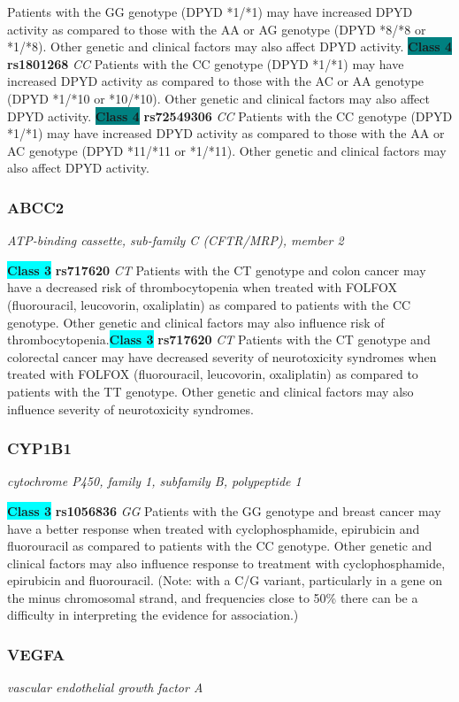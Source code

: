 \documentclass{report}
\begin{document}
Patients with the GG genotype (DPYD *1/*1) may have increased DPYD activity as compared to those with the AA or AG genotype (DPYD *8/*8 or *1/*8). Other genetic and clinical factors may also affect DPYD activity. \newline\textbf{\colorbox{teal} {Class 4}} \textbf{ rs1801268 } \textit{ CC }
Patients with the CC genotype (DPYD *1/*1) may have increased DPYD activity as compared to those with the AC or AA genotype (DPYD *1/*10 or *10/*10). Other genetic and clinical factors may also affect DPYD activity. \newline\textbf{\colorbox{teal} {Class 4}} \textbf{ rs72549306 } \textit{ CC }
Patients with the CC genotype (DPYD *1/*1) may have increased DPYD activity as compared to those with the AA or AC genotype (DPYD *11/*11 or *1/*11). Other genetic and clinical factors may also affect DPYD activity.\newline\subsubsection{ ABCC2 }
\textit{ ATP-binding cassette, sub-family C (CFTR/MRP), member 2 }

\textbf{\colorbox{cyan} {Class 3}} \textbf{ rs717620 } \textit{ CT }
Patients with the CT genotype and colon cancer may have a decreased risk of thrombocytopenia when treated with FOLFOX (fluorouracil, leucovorin, oxaliplatin) as compared to patients with the CC genotype. Other genetic and clinical factors may also influence risk of thrombocytopenia.\newline\textbf{\colorbox{cyan} {Class 3}} \textbf{ rs717620 } \textit{ CT }
Patients with the CT genotype and colorectal cancer may have decreased severity of neurotoxicity syndromes when treated with FOLFOX (fluorouracil, leucovorin, oxaliplatin) as compared to patients with the TT genotype. Other genetic and clinical factors may also influence severity of neurotoxicity syndromes.\newline\subsubsection{ CYP1B1 }
\textit{ cytochrome P450, family 1, subfamily B, polypeptide 1 }

\textbf{\colorbox{cyan} {Class 3}} \textbf{ rs1056836 } \textit{ GG }
Patients with the GG genotype and breast cancer may have a better response when treated with cyclophosphamide, epirubicin and fluorouracil as compared to patients with the CC genotype. Other genetic and clinical factors may also influence response to treatment with cyclophosphamide, epirubicin and fluorouracil.  (Note: with a C/G variant, particularly in a gene on the minus chromosomal strand, and frequencies close to 50\% there can be a difficulty in interpreting the evidence for association.)\newline\subsubsection{ VEGFA }
\textit{ vascular endothelial growth factor A }
\end{document}
